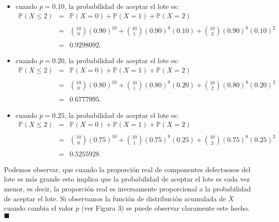 \documentclass[11pt,letterpaper]{article}
\newcommand{\mP}{\mathbb{P}}
\begin{document}
\begin{itemize}
\begin{itemize}
\item cuando $p=0.10$, la probabilidad de aceptar el lote es: 
\begin{equation*}
\begin{array}{ccl}
\mP(X\leq 2)&=&\mP(X=0)+\mP(X=1)+\mP(X=2)\\
&& \\
&=&{10\choose0}(0.90)^{10}+{10\choose1}(0.90)^9(0.10)+{10\choose2}(0.90)^8(0.10)^2\\
&& \\
&=& 0.9298092.
\end{array}
\end{equation*}
\item cuando $p=0.20$, la probabilidad de aceptar el lote es: 
\begin{equation*}
\begin{array}{ccl}
\mP(X\leq 2)&=&\mP(X=0)+\mP(X=1)+\mP(X=2)\\
&& \\
&=&{10\choose0}(0.80)^{10}+{10\choose1}(0.80)^9(0.20)+{10\choose2}(0.80)^8(0.20)^2\\
&& \\
&=& 0.6777995.
\end{array}
\end{equation*}
\item cuando $p=0.25$, la probabilidad de aceptar el lote es: 
\begin{equation*}
\begin{array}{ccl}
\mP(X\leq 2)&=&\mP(X=0)+\mP(X=1)+\mP(X=2)\\
&& \\
&=&{10\choose0}(0.75)^{10}+{10\choose1}(0.75)^9(0.25)+{10\choose2}(0.75)^8(0.25)^2\\
&& \\
&=& 0.5255928.
\end{array}
\end{equation*}
\end{itemize}

Podemos observar, que cuando la proporción real de componentes defectuosos del lote es más grande esto implica que la probabilidad de aceptar el lote es cada vez menor, es decir, la proporción real es inversamente proporcional a la probabilidad de aceptar el lote. Si observamos la función de distribución acumulada de $X$ cuando cambia el valor $p$ (ver Figura 3) se puede observar claramente este hecho. $\blacksquare$
\end{itemize}
\end{document}
